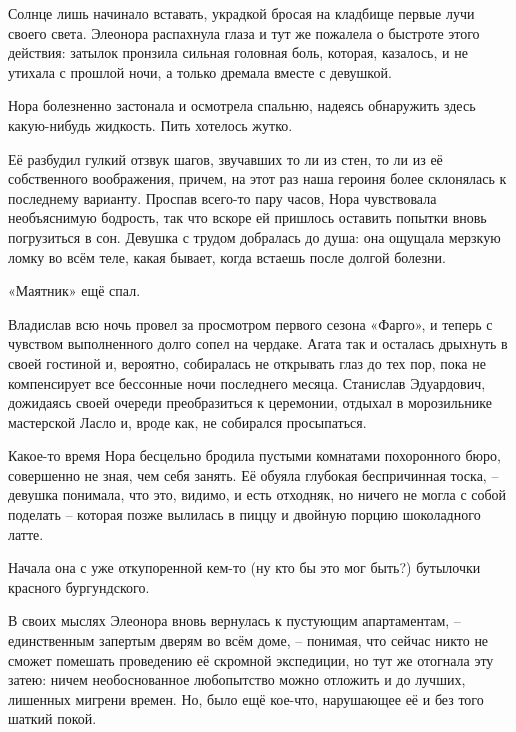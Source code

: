 \documentclass[
  a5paperpaper,
  DIV=11,
  numbers=noendperiod]{scrreprt}
\begin{document}

Солнце лишь начинало вставать, украдкой бросая на кладбище первые лучи
своего света. Элеонора распахнула глаза и тут же пожалела о быстроте
этого действия: затылок пронзила сильная головная боль, которая,
казалось, и не утихала с прошлой ночи, а только дремала вместе с
девушкой.

Нора болезненно застонала и осмотрела спальню, надеясь обнаружить здесь
какую-нибудь жидкость. Пить хотелось жутко.

Её разбудил гулкий отзвук шагов, звучавших то ли из стен, то ли из её
собственного воображения, причем, на этот раз наша героиня более
склонялась к последнему варианту. Проспав всего-то пару часов, Нора
чувствовала необъяснимую бодрость, так что вскоре ей пришлось оставить
попытки вновь погрузиться в сон. Девушка с трудом добралась до душа: она
ощущала мерзкую ломку во всём теле, какая бывает, когда встаешь после
долгой болезни.

«Маятник» ещё спал.

Владислав всю ночь провел за просмотром первого сезона «Фарго», и теперь
с чувством выполненного долго сопел на чердаке. Агата так и осталась
дрыхнуть в своей гостиной и, вероятно, собиралась не открывать глаз до
тех пор, пока не компенсирует все бессонные ночи последнего месяца.
Станислав Эдуардович, дожидаясь своей очереди преобразиться к церемонии,
отдыхал в морозильнике мастерской Ласло и, вроде как, не собирался
просыпаться.

Какое-то время Нора бесцельно бродила пустыми комнатами похоронного
бюро, совершенно не зная, чем себя занять. Её обуяла глубокая
беспричинная тоска, -- девушка понимала, что это, видимо, и есть
отходняк, но ничего не могла с собой поделать -- которая позже вылилась
в пиццу и двойную порцию шоколадного латте.

Начала она с уже откупоренной кем-то (ну кто бы это мог быть?) бутылочки
красного бургундского.

В своих мыслях Элеонора вновь вернулась к пустующим апартаментам, --
единственным запертым дверям во всём доме, -- понимая, что сейчас никто
не сможет помешать проведению её скромной экспедиции, но тут же отогнала
эту затею: ничем необоснованное любопытство можно отложить и до лучших,
лишенных мигрени времен. Но, было ещё кое-что, нарушающее её и без того
шаткий покой.
\end{document}
